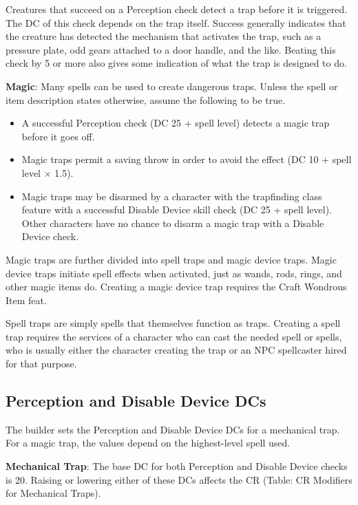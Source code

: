 Creatures that succeed on a Perception check detect a trap before it is triggered. The DC of this check depends on the trap itself. Success generally indicates that the creature has detected the mechanism that activates the trap, such as a pressure plate, odd gears attached to a door handle, and the like. Beating this check by 5 or more also gives some indication of what the trap is designed to do.
				
\textbf{Magic}: Many spells can be used to create dangerous traps. Unless the spell or item description states otherwise, assume the following to be true.
				\begin{itemize}\item  A successful Perception check (DC 25 + spell level) detects a magic trap before it goes off. 
				\item  Magic traps permit a saving throw in order to avoid the effect (DC 10 + spell level \mbox{$\times$} 1.5).
				\item  Magic traps may be disarmed by a character with the trapfinding class feature with a successful Disable Device skill check (DC 25 + spell level). Other characters have no chance to disarm a magic trap with a Disable Device check.
\end{itemize}
				
Magic traps are further divided into spell traps and magic device traps. Magic device traps initiate spell effects when activated, just as wands, rods, rings, and other magic items do. Creating a magic device trap requires the Craft Wondrous Item feat.
				
Spell traps are simply spells that themselves function as traps\textit{. }Creating a spell trap requires the services of a character who can cast the needed spell or spells, who is usually either the character creating the trap or an NPC spellcaster hired for that purpose. 
				
\subsection{Perception and Disable Device DCs}

				
The builder sets the Perception and Disable Device DCs for a mechanical trap. For a magic trap, the values depend on the highest-level spell used.
				
\textbf{Mechanical Trap}: The base DC for both Perception and Disable Device checks is 20. Raising or lowering either of these DCs affects the CR (Table: CR Modifiers for Mechanical Traps). 
				
